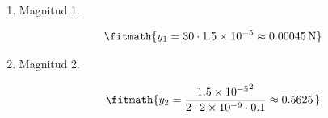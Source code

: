 \begin{enumerate}

\item Magnitud 1.

\[\fitmath{y_{1}=30\cdot 1.5\times10^{-5}\approx 0.00045\,\mathrm{N}}\]

\item Magnitud 2.

\[\fitmath{y_{2}=\frac{{1.5\times10^{-5}}^{2}}{2\cdot 2\times10^{-9}\cdot 0.1}\approx 0.5625\,}\]

\end{enumerate}
